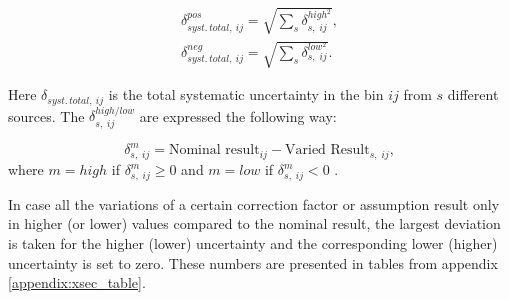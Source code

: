\begin{align}
 \delta_{syst.\,total,\:ij}^{pos} = \sqrt{\sum_{s}\delta_{s,\;ij}^{high^{2}}}, \\
 \delta_{syst.\,total,\:ij}^{neg} = \sqrt{\sum_{s}\delta_{s,\;ij}^{low^{2}}}.
\end{align}

Here $\delta_{syst.\,total,\:ij}$ is the total systematic uncertainty in the bin $ij$ from
$s$ different sources. The $\delta_{s,\;ij}^{high/low}$ are expressed the following way:

\begin{equation}
 \delta_{s,\;ij}^{m} = \textrm{Nominal result}_{ij} - \textrm{Varied Result}_{s,\;ij}, 
\end{equation}
where $m = high$ if $\delta_{s,\;ij}^{m} \geq 0$ and $m = low$ if $\delta_{s,\;ij}^{m} < 0$ . 

In case all the variations of a certain correction factor or assumption result only in higher (or lower) values 
compared to the nominal result, the largest deviation is taken for the higher (lower) uncertainty and the corresponding 
lower (higher) uncertainty is set to zero. These numbers are presented
in tables from appendix \ref{appendix:xsec_table}.

% 

% 
% 
% 
% 


